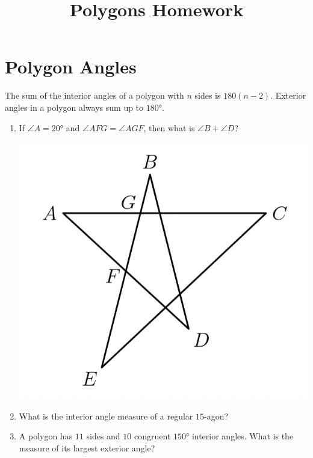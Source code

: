 \documentclass{article}
\title{Polygons Homework}
\author{}
\date{}
\begin{document}
\maketitle
\section*{Polygon Angles}
The sum of the interior angles of a polygon with $n$ sides is $180(n - 2)$. 
Exterior angles in a polygon always sum up to $\ang{180}$.
\begin{enumerate}
    \item If $\angle A = \ang{20}$ and $\angle AFG = \angle AGF$, then what is $\angle B + \angle D$?
        \begin{center}
            \includegraphics[scale=0.5]{star.png}
        \end{center}
        \vspace{1 cm}
    \item What is the interior angle measure of a regular $15$-agon?
        \vspace{3cm}
    \item A polygon has $11$ sides and $10$ congruent $\ang{150}$ interior angles.
        What is the measure of its largest exterior angle?
        \vspace{3 cm}
\end{enumerate}
\end{document}
